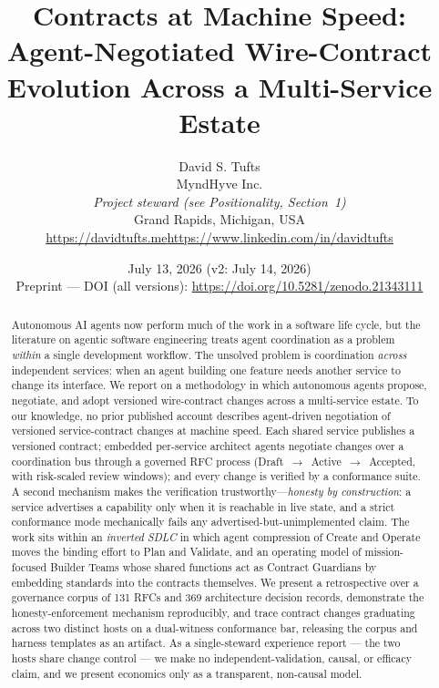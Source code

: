 \documentclass[11pt]{article}
\title{Contracts at Machine Speed:\\ Agent-Negotiated Wire-Contract Evolution Across a Multi-Service Estate}
\author{David S. Tufts\\
MyndHyve Inc.\\
\emph{\small Project steward (see Positionality, Section~1)}\\
Grand Rapids, Michigan, USA\\
\url{https://davidtufts.me}\quad\url{https://www.linkedin.com/in/davidtufts}}
\date{July 13, 2026 (v2: July 14, 2026)\\[3pt]
{\small Preprint --- DOI (all versions): \url{https://doi.org/10.5281/zenodo.21343111}}}
\begin{document}
\maketitle

\begin{abstract}
Autonomous AI agents now perform much of the work in a software life cycle, but the
literature on agentic software engineering treats agent coordination as a problem \emph{within}
a single development workflow. The unsolved problem is coordination \emph{across} independent
services: when an agent building one feature needs another service to change its interface.
We report on a methodology in which autonomous agents propose, negotiate, and adopt
versioned wire-contract changes across a multi-service estate. To our knowledge, no prior published
account describes agent-driven negotiation of versioned service-contract changes at machine speed. Each shared service
publishes a versioned contract; embedded per-service architect agents negotiate changes over
a coordination bus through a governed RFC process (Draft~$\rightarrow$~Active~$\rightarrow$~Accepted,
with risk-scaled review windows); and every change is verified by a conformance suite. A second
mechanism makes the verification trustworthy---\emph{honesty by construction}: a service advertises
a capability only when it is reachable in live state, and a strict conformance mode mechanically
fails any advertised-but-unimplemented claim. The work sits within an \emph{inverted SDLC} in which
agent compression of Create and Operate moves the binding effort to Plan and Validate, and an
operating model of mission-focused Builder Teams whose shared functions act as Contract Guardians by
embedding standards into the contracts themselves. We present a retrospective over a governance
corpus of 131 RFCs and 369 architecture decision records,
demonstrate the honesty-enforcement mechanism reproducibly, and trace contract changes graduating
across two distinct hosts on a dual-witness conformance bar, releasing the corpus and harness
templates as an artifact. As a single-steward experience report --- the two hosts share change
control --- we make no independent-validation, causal, or efficacy claim, and we present economics
only as a transparent, non-causal model.
\end{abstract}
\end{document}
